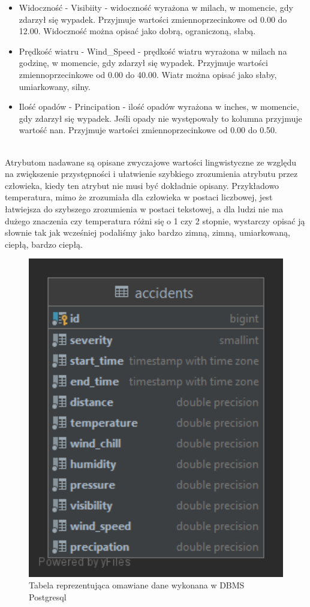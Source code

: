 \documentclass{classrep}
\begin{document}
\begin{itemize}
\item Widoczność - Visibiity - widoczność wyrażona w milach, w momencie, gdy zdarzył się wypadek. Przyjmuje wartości zmiennoprzecinkowe od 0.00 do 12.00.
Widoczność można opisać jako dobrą, ograniczoną, słabą.
\item Prędkość wiatru - Wind\_Speed - prędkość wiatru wyrażona w milach na godzinę, w momencie, gdy zdarzył się wypadek. Przyjmuje wartości zmiennoprzecinkowe od 0.00 do 40.00. Wiatr można opisać jako słaby, umiarkowany, silny.
\item Ilość opadów - Principation - ilość opadów wyrażona w inches, w momencie, gdy zdarzył się wypadek. Jeśli opady nie występowały to kolumna przyjmuje wartość nan. Przyjmuje wartości zmiennoprzecinkowe od 0.00 do 0.50.
\end{itemize}
\ \\
Atrybutom nadawane są opisane zwyczajowe wartości lingwistyczne ze względu na zwiększenie przystępności i ułatwienie szybkiego zrozumienia atrybutu przez człowieka, kiedy ten atrybut nie musi być dokładnie opisany.
Przykładowo temperatura, mimo że zrozumiała dla człowieka w postaci liczbowej, jest łatwiejsza do szybszego zrozumienia w postaci tekstowej, a dla ludzi nie ma dużego znaczenia czy temperatura różni się o 1 czy 2 stopnie, wystarczy opisać ją słownie tak jak wcześniej podaliśmy jako bardzo zimną, zimną, umiarkowaną, ciepłą, bardzo ciepłą.

\newpage
\begin{figure}[h!]
\centering
\includegraphics[width=14cm]{accidents.png}
\vspace{-0.3cm}
\caption{Tabela reprezentująca omawiane dane wykonana w DBMS Postgresql}
\label{Wynik klasyfikacji.}
\end{figure}
\newpage
\end{document}
